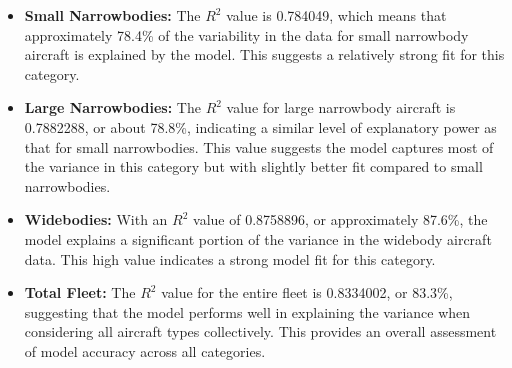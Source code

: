 \begin{itemize}
    \item \textbf{Small Narrowbodies:} The \( R^2 \) value is 0.784049, which means that approximately 78.4\% of the variability in the data for small narrowbody aircraft is explained by the model. This suggests a relatively strong fit for this category.

    \item \textbf{Large Narrowbodies:} The \( R^2 \) value for large narrowbody aircraft is 0.7882288, or about 78.8\%, indicating a similar level of explanatory power as that for small narrowbodies. This value suggests the model captures most of the variance in this category but with slightly better fit compared to small narrowbodies.

    \item \textbf{Widebodies:} With an \( R^2 \) value of 0.8758896, or approximately 87.6\%, the model explains a significant portion of the variance in the widebody aircraft data. This high value indicates a strong model fit for this category.

    \item \textbf{Total Fleet:} The \( R^2 \) value for the entire fleet is 0.8334002, or 83.3\%, suggesting that the model performs well in explaining the variance when considering all aircraft types collectively. This provides an overall assessment of model accuracy across all categories.

\end{itemize}